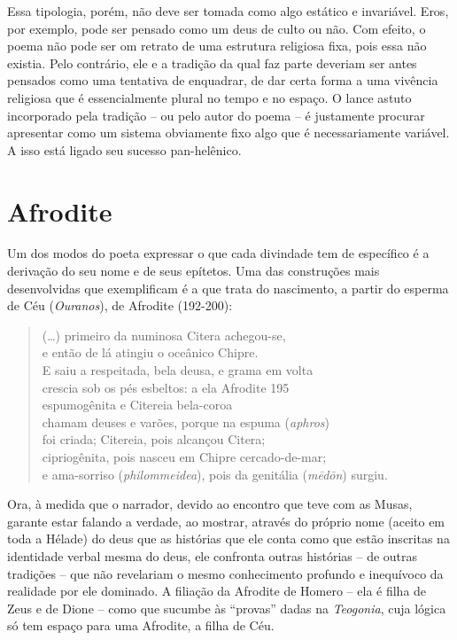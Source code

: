 Essa tipologia, porém, não deve ser tomada como algo estático e
invariável. Eros, por exemplo, pode ser pensado como um deus de culto ou
não. Com efeito, o poema não pode ser om retrato de uma estrutura
religiosa fixa, pois essa não existia. Pelo contrário, ele e a tradição
da qual faz parte deveriam ser antes pensados como uma tentativa de
enquadrar, de dar certa forma a uma vivência religiosa que é
essencialmente plural no tempo e no espaço. O lance astuto incorporado
pela tradição -- ou pelo autor do poema -- é justamente procurar
apresentar como um sistema obviamente fixo algo que é necessariamente
variável. A isso está ligado seu sucesso pan-helênico.

\section{Afrodite}

Um dos modos do poeta expressar o que cada divindade tem de específico é
a derivação do seu nome e de seus epítetos. Uma das construções mais
desenvolvidas que exemplificam é a que trata do nascimento, a partir do
esperma de Céu (\emph{Ouranos}), de Afrodite (192-200):

\begin{verse}
(\ldots{}) primeiro da numinosa Citera achegou-se,\\
e então de lá atingiu o oceânico Chipre.\\
E saiu a respeitada, bela deusa, e grama em volta\\
crescia sob os pés esbeltos: a ela Afrodite \num{195}\\
espumogênita e Citereia bela-coroa\\
chamam deuses e varões, porque na espuma (\emph{aphros})\\
foi criada; Citereia, pois alcançou Citera;\\
cipriogênita, pois nasceu em Chipre cercado-de-mar;\\
e ama-sorriso (\emph{philommeidea}), pois da genitália (\emph{mēdōn}) surgiu.
\end{verse}

Ora, à medida que o narrador, devido ao encontro que teve com as Musas,
garante estar falando a verdade, ao mostrar, através do próprio nome
(aceito em toda a Hélade) do deus que as histórias que ele conta como
que estão inscritas na identidade verbal mesma do deus, ele confronta
outras histórias -- de outras tradições -- que não revelariam o mesmo
conhecimento profundo e inequívoco da realidade por ele dominado. A
filiação da Afrodite de Homero -- ela é filha de Zeus e de Dione -- como
que sucumbe às ``provas'' dadas na \emph{Teogonia}, cuja lógica só tem
espaço para uma Afrodite, a filha de Céu.


